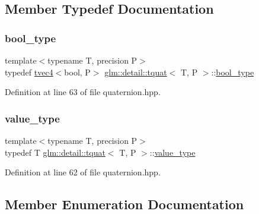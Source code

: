 \subsection{Member Typedef Documentation}
\mbox{\label{structglm_1_1detail_1_1tquat_a22ca5a5296466eb23f4f499ffecc8d46}} 
\subsubsection{\texorpdfstring{bool\+\_\+type}{bool\_type}}
{\footnotesize\ttfamily template$<$typename T, precision P$>$ \\
typedef \hyperlink{structglm_1_1detail_1_1tvec4}{tvec4}$<$bool, P$>$ \hyperlink{structglm_1_1detail_1_1tquat}{glm\+::detail\+::tquat}$<$ T, P $>$\+::\hyperlink{structglm_1_1detail_1_1tquat_a22ca5a5296466eb23f4f499ffecc8d46}{bool\+\_\+type}}



Definition at line 63 of file quaternion.\+hpp.

\mbox{\label{structglm_1_1detail_1_1tquat_af313f5388bc71d19ec712f20fe24cc9b}} 
\subsubsection{\texorpdfstring{value\+\_\+type}{value\_type}}
{\footnotesize\ttfamily template$<$typename T, precision P$>$ \\
typedef T \hyperlink{structglm_1_1detail_1_1tquat}{glm\+::detail\+::tquat}$<$ T, P $>$\+::\hyperlink{structglm_1_1detail_1_1tquat_af313f5388bc71d19ec712f20fe24cc9b}{value\+\_\+type}}



Definition at line 62 of file quaternion.\+hpp.



\subsection{Member Enumeration Documentation}
\mbox{\label{structglm_1_1detail_1_1tquat_a61a530a53df553ec85f45e6b5ce6d7c3}} 
